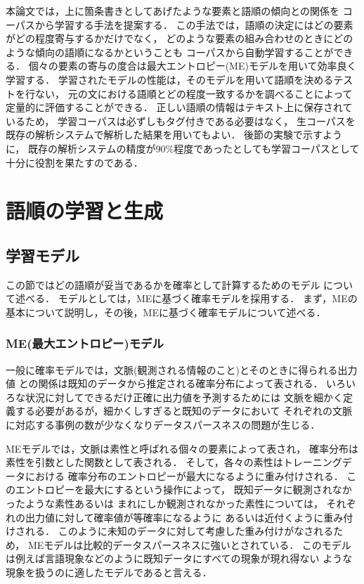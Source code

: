 本論文では，上に箇条書きとしてあげたような要素と語順の傾向との関係を
コーパスから学習する手法を提案する．
この手法では，語順の決定にはどの要素がどの程度寄与するかだけでなく，
どのような要素の組み合わせのときにどのような傾向の語順になるかということも
コーパスから自動学習することができる．
個々の要素の寄与の度合は最大エントロピー(ME)モデルを用いて効率良く学習する．
学習されたモデルの性能は，そのモデルを用いて語順を決めるテストを行ない，
元の文における語順とどの程度一致するかを調べることによって
定量的に評価することができる．
正しい語順の情報はテキスト上に保存されているため，
学習コーパスは必ずしもタグ付きである必要はなく，
生コーパスを既存の解析システムで解析した結果を用いてもよい．
後節の実験で示すように，
既存の解析システムの精度が90\%程度であったとしても学習コーパスとして
十分に役割を果たすのである．

\section{語順の学習と生成}
\label{sec:learning_and_generation}

\subsection{学習モデル}
\label{sec:model}

この節ではどの語順が妥当であるかを確率として計算するためのモデル
について述べる．
モデルとしては，MEに基づく確率モデルを採用する．
まず，MEの基本について説明し，その後，MEに基づく確率モデルについて述べる．

\subsubsection{ME(最大エントロピー)モデル}
\label{sec:me_model}

一般に確率モデルでは，文脈(観測される情報のこと)とそのときに得られる出力値
との関係は既知のデータから推定される確率分布によって表される．
いろいろな状況に対してできるだけ正確に出力値を予測するためには
文脈を細かく定義する必要があるが，細かくしすぎると既知のデータにおいて
それぞれの文脈に対応する事例の数が少なくなりデータスパースネスの問題が生じる．

MEモデルでは，文脈は素性と呼ばれる個々の要素によって表され，
確率分布は素性を引数とした関数として表される．
そして，各々の素性はトレーニングデータにおける
確率分布のエントロピーが最大になるように重み付けされる．
このエントロピーを最大にするという操作によって，
既知データに観測されなかったような素性あるいは
まれにしか観測されなかった素性については，
それぞれの出力値に対して確率値が等確率になるように
あるいは近付くように重み付けされる．
このように未知のデータに対して考慮した重み付けがなされるため，
MEモデルは比較的データスパースネスに強いとされている．
このモデルは例えば言語現象などのように既知データにすべての現象が現れ得ない
ような現象を扱うのに適したモデルであると言える．


